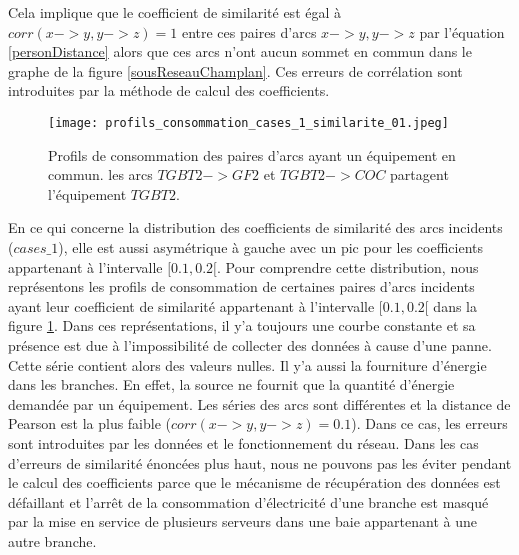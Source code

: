 	Cela implique que le coefficient de similarit\'e est \'egal \`a $corr(x->y,y->z) = 1$ entre ces paires d'arcs $x->y,y->z$ par l'\'equation \ref{personDistance} alors que ces arcs n'ont aucun sommet en commun dans le graphe de la figure \ref{sousReseauChamplan}.
	Ces erreurs de corr\'elation sont introduites par la m\'ethode de calcul des coefficients.
	\newline  
		\begin{figure}[htb!] 
		\centering
		\texttt{[image: profils\_consommation\_cases\_1\_similarite\_01.jpeg]}
		\caption{ Profils de consommation des paires d'arcs ayant un \'equipement en commun. 
		les arcs $TGBT2->GF2$ et $TGBT2->COC$ partagent l'\'equipement $TGBT2$.}
		\label{profils_consommation_cases_1_similarite_01}
		\end{figure}
	En ce qui concerne la distribution des coefficients de similarit\'e des arcs incidents ($cases\_1$), elle est aussi asym\'etrique \`a gauche avec un pic  pour les coefficients appartenant \`a l'intervalle $[0.1,0.2[$. Pour comprendre cette distribution, nous repr\'esentons les profils de consommation de certaines paires d'arcs incidents  ayant leur coefficient de similarit\'e appartenant \`a  l'intervalle $[0.1,0.2[$ dans la figure \ref{profils_consommation_cases_1_similarite_01}.  
	Dans ces repr\'esentations, il y'a toujours une courbe constante et sa pr\'esence est due \`a l'impossibilit\'e de collecter des donn\'ees \`a cause d'une panne. 
	Cette s\'erie contient alors des valeurs nulles. Il y'a aussi la fourniture d'\'energie dans les branches. En effet, la source ne fournit que la quantit\'e d'\'energie demand\'ee par un \'equipement. Les s\'eries des arcs sont diff\'erentes et la distance de Pearson est la plus faible ($corr(x->y,y->z) = 0.1$). 
	Dans ce cas, les erreurs sont introduites par les donn\'ees et le fonctionnement du r\'eseau.
\newline	
Dans les cas d'erreurs de similarit\'e \'enonc\'ees plus haut, nous ne pouvons pas les \'eviter  pendant le calcul des coefficients parce que le m\'ecanisme de r\'ecup\'eration des donn\'ees est d\'efaillant et  l'arr\^et de la consommation d'\'electricit\'e d'une branche est masqu\'e par la mise en service de plusieurs serveurs dans une baie appartenant \`a une autre branche.
\newline 

